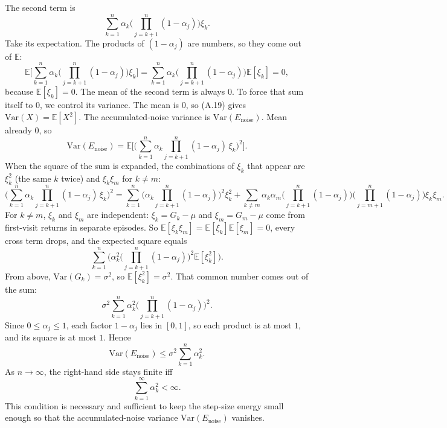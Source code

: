 The second term is
\[
\sum_{k=1}^{n}\alpha_k\Biggl(\prod_{j=k+1}^{n}(1-\alpha_j)\Biggr)\xi_k.
\]
Take its expectation. The products of $(1-\alpha_j)$ are numbers, so they come out of $\mathbb{E}$:
\[
\mathbb{E}\Biggl[\sum_{k=1}^{n}\alpha_k\Biggl(\prod_{j=k+1}^{n}(1-\alpha_j)\Biggr)\xi_k\Biggr]
=
\sum_{k=1}^{n}\alpha_k\Biggl(\prod_{j=k+1}^{n}(1-\alpha_j)\Biggr)\mathbb{E}[\xi_k]
=
0,
\]
because $\mathbb{E}[\xi_k]=0$. The mean of the second term is always $0$. To force that sum itself to $0$, we control its variance. The mean is $0$, so (A.19) gives $\mathrm{Var}(X)=\mathbb{E}[X^2]$.
The accumulated-noise variance is $\mathrm{Var}(E_{\text{noise}})$. Mean already $0$, so
\[
\mathrm{Var}(E_{\text{noise}})
=
\mathbb{E}\Biggl[\Biggl(\sum_{k=1}^{n}\alpha_k\prod_{j=k+1}^{n}(1-\alpha_j)\,\xi_k\Biggr)^2\Biggr].
\]
When the square of the sum is expanded, the combinations of $\xi_k$ that appear are $\xi_k^2$ (the same $k$ twice) and $\xi_k\xi_m$ for $k\neq m$:
\[
\Biggl(\sum_{k=1}^{n}\alpha_k\prod_{j=k+1}^{n}(1-\alpha_j)\,\xi_k\Biggr)^2
=
\sum_{k=1}^{n}\Biggl(\alpha_k\prod_{j=k+1}^{n}(1-\alpha_j)\Biggr)^2\xi_k^2
+
\sum_{k\neq m}\alpha_k\alpha_m\Biggl(\prod_{j=k+1}^{n}(1-\alpha_j)\Biggr)\Biggl(\prod_{j=m+1}^{n}(1-\alpha_j)\Biggr)\xi_k\xi_m.
\]
For $k\neq m$, $\xi_k$ and $\xi_m$ are independent: $\xi_k=G_k-\mu$ and $\xi_m=G_m-\mu$ come from first-visit returns in separate episodes. So $\mathbb{E}[\xi_k\xi_m]=\mathbb{E}[\xi_k]\mathbb{E}[\xi_m]=0$, every cross term drops, and the expected square equals
\[
\sum_{k=1}^{n}\Biggl(\alpha_k^2\Biggl(\prod_{j=k+1}^{n}(1-\alpha_j)\Biggr)^2\mathbb{E}[\xi_k^2]\Biggr).
\]
From above, $\mathrm{Var}(G_k)=\sigma^2$, so $\mathbb{E}[\xi_k^2]=\sigma^2$. That common number comes out of the sum:
\[
\sigma^2\sum_{k=1}^{n}\alpha_k^2\Biggl(\prod_{j=k+1}^{n}(1-\alpha_j)\Biggr)^2.
\]
Since $0\le\alpha_j\le 1$, each factor $1-\alpha_j$ lies in $[0,1]$, so each product is at most $1$, and its square is at most $1$. Hence
\begin{equation}
\mathrm{Var}(E_{\text{noise}})
\le
\sigma^2\sum_{k=1}^{n}\alpha_k^2.
\tag{D.8}
\end{equation}
As $n\to\infty$, the right-hand side stays finite iff
\begin{equation}
\sum_{k=1}^{\infty}\alpha_k^2<\infty.
\tag{D.9}
\end{equation}
This condition is necessary and sufficient to keep the step-size energy small enough so that the accumulated-noise variance $\mathrm{Var}(E_{\text{noise}})$ vanishes.

